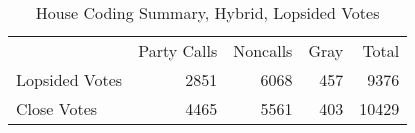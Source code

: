 \documentclass[12pt]{article}
\begin{document}
\begin{table}[ht]
	\caption{House Coding Summary, Hybrid, Lopsided Votes}
	\centering
	\begin{tabular}{lrrrr}
		\hline
		& Party Calls & Noncalls & Gray & Total \\
		Lopsided Votes & 2851 &  6068 & 457 & 9376 \\
		Close Votes & 4465 & 5561  & 403  & 10429 \\
		\hline
		
	\end{tabular}
\end{table}         


























	
	
\end{document}
